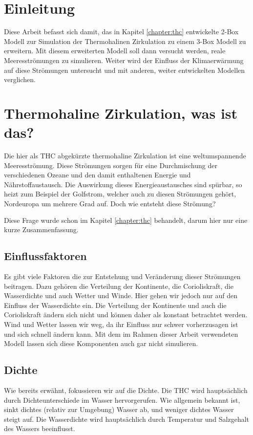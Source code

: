 \section{Einleitung}

Diese Arbeit befasst sich damit, das in Kapitel \ref{chapter:thc} entwickelte 2-Box Modell zur Simulation der Thermohalinen Zirkulation zu einem 3-Box Modell zu erweitern. Mit diesem erweiterten Modell soll dann versucht werden, reale Meeresströmungen zu simulieren. Weiter wird der Einfluss der Klimaerwärmung auf diese Strömungen untersucht und mit anderen, weiter entwickelten Modellen verglichen.

\section{Thermohaline Zirkulation, was ist das?}

Die hier als THC abgekürzte thermohaline Zirkulation ist eine weltumspannende Meeresströmung.
Diese Strömungen sorgen für eine Durchmischung der verschiedenen Ozeane und den damit enthaltenen Energie und Nährstoffaustausch. 
Die Auswirkung dieses Energieaustausches sind spürbar, so heizt zum Beispiel der Golfstrom, welcher auch zu diesen Strömungen gehört, Nordeuropa um mehrere Grad auf.
Doch wie entsteht diese Strömung? 

Diese Frage wurde schon im Kapitel \ref{chapter:thc} behandelt, darum hier nur eine kurze Zusammenfassung. 



\subsection{Einflussfaktoren}
Es gibt viele Faktoren die zur Entstehung und Veränderung dieser Strömungen beitragen. Dazu gehören die Verteilung der Kontinente, die Corioliskraft, die Wasserdichte und auch Wetter und Winde. Hier gehen wir jedoch nur auf den Einfluss der Wasserdichte ein.
Die Verteilung der Kontinente und auch die Corioliskraft ändern sich nicht und können daher als konstant betrachtet werden. Wind und Wetter lassen wir weg, da ihr Einfluss nur schwer vorherzusagen ist und sich schnell ändern kann. Mit dem im Rahmen dieser Arbeit verwendeten Modell lassen sich diese Komponenten auch gar nicht simulieren.

\subsection{Dichte}
Wie bereits erwähnt, fokussieren wir auf die Dichte.
Die THC wird hauptsächlich durch Dichteunterschiede im Wasser hervorgerufen.
Wie allgemein bekannt ist, sinkt dichtes (relativ zur Umgebung) Wasser ab, und weniger dichtes Wasser steigt auf. Die Wasserdichte wird hauptsächlich durch Temperatur und Salzgehalt des Wassers beeinflusst.

